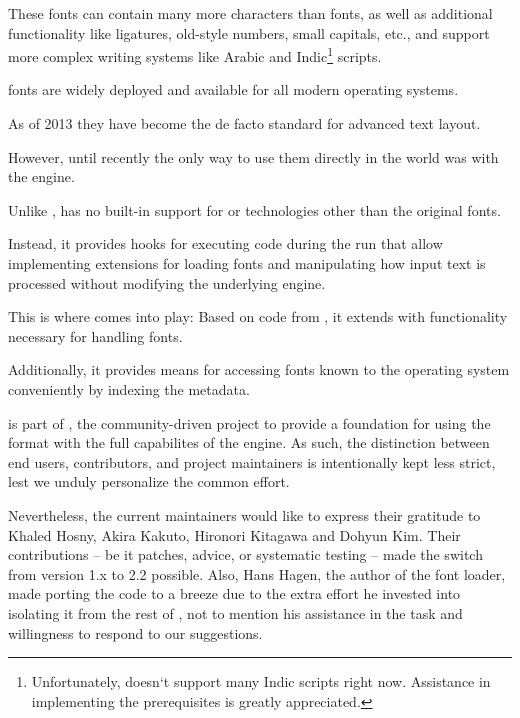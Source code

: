 These fonts can contain many more characters than \TEX fonts, as well
as additional functionality like ligatures, old-style numbers, small
capitals, etc., and support more complex writing systems like Arabic
and Indic\footnote{%
  Unfortunately,  doesn‘t support many Indic
  scripts right now.
  Assistance in implementing the prerequisites is greatly
  appreciated.
}
scripts.

\OpenType fonts are widely deployed and available for all modern
operating systems.

As of 2013 they have become the de facto standard for advanced text
layout.

However, until recently the only way to use them directly in the \TEX
world was with the \XETEX engine.

Unlike \XETEX, \LUATEX has no built-in support for \OpenType or
technologies other than the original \TEX fonts.

Instead, it provides hooks for executing \LUA code during the \TEX run
that allow implementing extensions for loading fonts and manipulating
how input text is processed without modifying the underlying engine.

This is where  comes into play:
Based on code from \CONTEXT, it extends \LUATEX with functionality necessary
for handling \OpenType fonts.

Additionally, it provides means for accessing fonts known to the operating
system conveniently by indexing the metadata.

\endsection


 is part of \LUALATEX, the community-driven
project to provide a foundation for using the \LATEX format with the
full capabilites of the \LUATEX engine.
%
As such, the distinction between end users, contributors, and project
maintainers is intentionally kept less strict, lest we unduly
personalize the common effort.

Nevertheless, the current maintainers would like to express their
gratitude to Khaled Hosny, Akira Kakuto, Hironori Kitagawa and Dohyun
Kim.
%
Their contributions -- be it patches, advice, or systematic
testing -- made the switch from version 1.x to 2.2 possible.
%
Also, Hans Hagen, the author of the font loader, made porting the
code to \LATEX a breeze due to the extra effort he invested into
isolating it from the rest of \CONTEXT, not to mention his assistance
in the task and willingness to respond to our suggestions.

